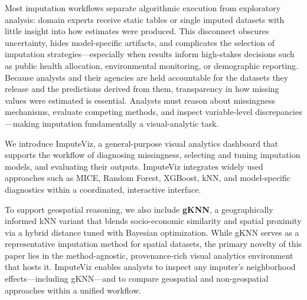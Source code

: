 \documentclass{egpubl}
\begin{document}
Most imputation workflows separate algorithmic execution from exploratory analysis: domain experts receive static tables or single imputed datasets with little insight into how estimates were produced. This disconnect obscures uncertainty, hides model-specific artifacts, and complicates the selection of imputation strategies—especially when results inform high-stakes decisions such as public health allocation, environmental monitoring, or demographic reporting. Because analysts and their agencies are held accountable for the datasets they release and the predictions derived from them, transparency in how missing values were estimated is essential. Analysts must reason about missingness mechanisms, evaluate competing methods, and inspect variable-level discrepancies—making imputation fundamentally a visual-analytic task.

We introduce ImputeViz, a general-purpose visual analytics dashboard that supports the workflow of diagnosing missingness, selecting and tuning imputation models, and evaluating their outputs. ImputeViz integrates widely used approaches such as MICE, Random Forest, XGBoost, kNN, and model-specific diagnostics within a coordinated, interactive interface.

To support geospatial reasoning, we also include \textbf{gKNN}, a geographically informed kNN variant that blends socio-economic similarity and spatial proximity via a hybrid distance tuned with Bayesian optimization. While gKNN serves as a representative imputation method for spatial datasets, the primary novelty of this paper lies in the method-agnostic, provenance-rich visual analytics environment that hosts it. ImputeViz enables analysts to inspect any imputer’s neighborhood effects—including gKNN—and to compare geospatial and non-geospatial approaches within a unified workflow.


\end{document}
